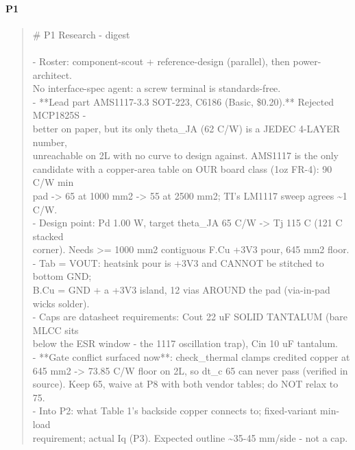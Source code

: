\documentclass[11pt,a4paper]{article}
\begin{document}
\paragraph*{P1}
\begin{quote}\small\ttfamily\raggedright
\# P1 Research - digest\\
~\\
- Roster: component-scout + reference-design (parallel), then power-architect.\\
  No interface-spec agent: a screw terminal is standards-free.\\
- {*}{*}Lead part AMS1117-3.3 SOT-223, C6186 (Basic, \$0.20).{*}{*} Rejected MCP1825S -\\
  better on paper, but its only theta\_JA (62 C/W) is a JEDEC 4-LAYER number,\\
  unreachable on 2L with no curve to design against. AMS1117 is the only\\
  candidate with a copper-area table on OUR board class (1oz FR-4): 90 C/W min\\
  pad -\textgreater{} 65 at 1000 mm2 -\textgreater{} 55 at 2500 mm2; TI's LM1117 sweep agrees \textasciitilde{}1 C/W.\\
- Design point: Pd 1.00 W, target theta\_JA 65 C/W -\textgreater{} Tj 115 C (121 C stacked\\
  corner). Needs \textgreater{}= 1000 mm2 contiguous F.Cu +3V3 pour, 645 mm2 floor.\\
- Tab = VOUT: heatsink pour is +3V3 and CANNOT be stitched to bottom GND;\\
  B.Cu = GND + a +3V3 island, 12 vias AROUND the pad (via-in-pad wicks solder).\\
- Caps are datasheet requirements: Cout 22 uF SOLID TANTALUM (bare MLCC sits\\
  below the ESR window - the 1117 oscillation trap), Cin 10 uF tantalum.\\
- {*}{*}Gate conflict surfaced now{*}{*}: check\_thermal clamps credited copper at\\
  645 mm2 -\textgreater{} 73.85 C/W floor on 2L, so dt\_c 65 can never pass (verified in\\
  source). Keep 65, waive at P8 with both vendor tables; do NOT relax to 75.\\
- Into P2: what Table 1's backside copper connects to; fixed-variant min-load\\
  requirement; actual Iq (P3). Expected outline \textasciitilde{}35-45 mm/side - not a cap.
\end{quote}
\end{document}
